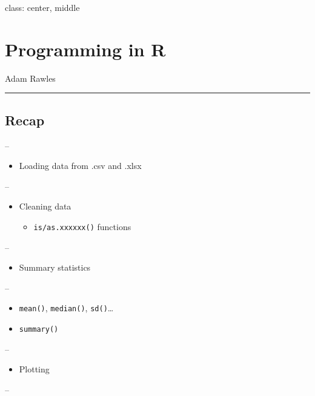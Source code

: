 \documentclass[]{article}
\title{}
\author{}
\date{}
\providecommand{\tightlist}{%
  \setlength{\itemsep}{0pt}\setlength{\parskip}{0pt}}
\begin{document}
class: center, middle

\hypertarget{programming-in-r}{%
\section{Programming in R}\label{programming-in-r}}

Adam Rawles

\begin{center}\rule{0.5\linewidth}{\linethickness}\end{center}

\hypertarget{recap}{%
\subsection{Recap}\label{recap}}

--

\begin{itemize}
\tightlist
\item
  Loading data from .csv and .xlsx
\end{itemize}

--

\begin{itemize}
\tightlist
\item
  Cleaning data

  \begin{itemize}
  \tightlist
  \item
    \texttt{is/as.xxxxxx()} functions
  \end{itemize}
\end{itemize}

--

\begin{itemize}
\tightlist
\item
  Summary statistics
\end{itemize}

--

\begin{itemize}
\tightlist
\item
  \texttt{mean()}, \texttt{median()}, \texttt{sd()}\ldots{}
\item
  \texttt{summary()}
\end{itemize}

--

\begin{itemize}
\tightlist
\item
  Plotting
\end{itemize}

--
\end{document}
